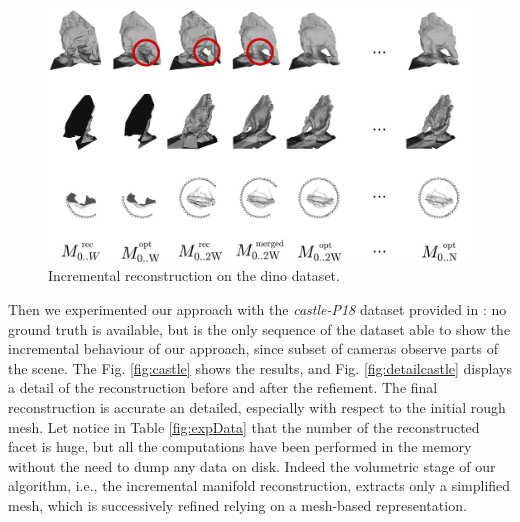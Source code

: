  \begin{figure}[t]
  \centering
  \includegraphics[width=\textwidth]{./img/ch-incr-dens/dino}
  \caption{Incremental reconstruction on the dino dataset.}
  \label{fig:dinoIncr}
\end{figure}


Then we experimented our approach with the \emph{castle-P18} dataset provided in \cite{strecha2008}: no ground truth is available, but is the only sequence of the dataset able to show the incremental behaviour of our approach, since subset of cameras observe parts of the scene. 
The Fig. \ref{fig:castle} shows the results, and Fig. \ref{fig:detailcastle} displays a detail of the reconstruction before and after the refiement. The final reconstruction is accurate  an detailed, especially with respect to the initial rough mesh.
Let notice in Table \ref{fig:expData} that the number of the reconstructed facet is huge, but all the computations have been performed in the memory without the need to dump any data on disk. Indeed the volumetric stage of our algorithm, i.e., the incremental manifold reconstruction, extracts only a  simplified mesh, which is successively refined relying on a mesh-based representation.




